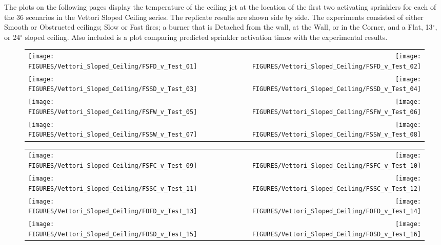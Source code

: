 The plots on the following pages display the temperature of the ceiling jet at the location of the first two activating sprinklers for each of the 36 scenarios in the
Vettori Sloped Ceiling series. The replicate results are shown side by side. The
experiments consisted of either Smooth or Obstructed ceilings; Slow or Fast fires; a burner that is Detached from the wall, at the Wall, or in the Corner, and
a Flat, 13$^\circ$, or 24$^\circ$ sloped ceiling.
Also included is a plot comparing predicted sprinkler activation times with the experimental results.

\begin{figure}[p]
\begin{tabular*}{\textwidth}{l@{\extracolsep{\fill}}r}
\texttt{[image: FIGURES/Vettori\_Sloped\_Ceiling/FSFD\_v\_Test\_01]} &
\texttt{[image: FIGURES/Vettori\_Sloped\_Ceiling/FSFD\_v\_Test\_02]} \\
\texttt{[image: FIGURES/Vettori\_Sloped\_Ceiling/FSSD\_v\_Test\_03]} &
\texttt{[image: FIGURES/Vettori\_Sloped\_Ceiling/FSSD\_v\_Test\_04]} \\
\texttt{[image: FIGURES/Vettori\_Sloped\_Ceiling/FSFW\_v\_Test\_05]} &
\texttt{[image: FIGURES/Vettori\_Sloped\_Ceiling/FSFW\_v\_Test\_06]} \\
\texttt{[image: FIGURES/Vettori\_Sloped\_Ceiling/FSSW\_v\_Test\_07]} &
\texttt{[image: FIGURES/Vettori\_Sloped\_Ceiling/FSSW\_v\_Test\_08]} \\
\end{tabular*}
\label{Vettori_Sloped_1}
\end{figure}


\begin{figure}[p]
\begin{tabular*}{\textwidth}{l@{\extracolsep{\fill}}r}
\texttt{[image: FIGURES/Vettori\_Sloped\_Ceiling/FSFC\_v\_Test\_09]} &
\texttt{[image: FIGURES/Vettori\_Sloped\_Ceiling/FSFC\_v\_Test\_10]} \\
\texttt{[image: FIGURES/Vettori\_Sloped\_Ceiling/FSSC\_v\_Test\_11]} &
\texttt{[image: FIGURES/Vettori\_Sloped\_Ceiling/FSSC\_v\_Test\_12]} \\
\texttt{[image: FIGURES/Vettori\_Sloped\_Ceiling/FOFD\_v\_Test\_13]} &
\texttt{[image: FIGURES/Vettori\_Sloped\_Ceiling/FOFD\_v\_Test\_14]} \\
\texttt{[image: FIGURES/Vettori\_Sloped\_Ceiling/FOSD\_v\_Test\_15]} &
\texttt{[image: FIGURES/Vettori\_Sloped\_Ceiling/FOSD\_v\_Test\_16]} \\
\end{tabular*}
\label{Vettori_Sloped_2}
\end{figure}

